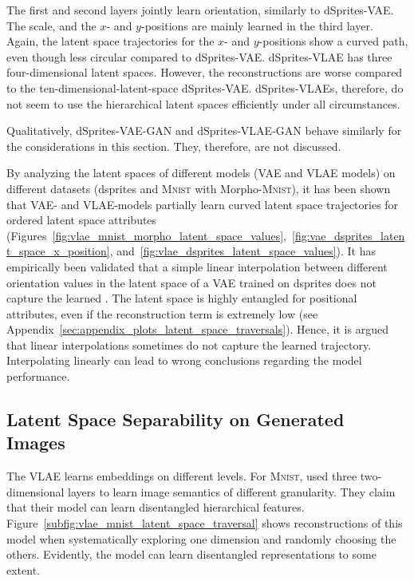 The first and second layers jointly learn orientation, similarly to dSprites-\ac{VAE}.
The scale, and the $x$- and $y$-positions are mainly learned in the third layer.
Again, the latent space trajectories for the $x$- and $y$-positions show a curved path, even though less circular compared to dSprites-\ac{VAE}.
dSprites-\ac{VLAE} has three four-dimensional latent spaces.
However, the reconstructions are worse compared to the ten-dimensional-latent-space dSprites-\ac{VAE}.
dSprites-\acp{VLAE}, therefore, do not seem to use the hierarchical latent spaces efficiently under all circumstances.

Qualitatively, dSprites-\ac{VAE}-\ac{GAN} and dSprites-\ac{VLAE}-\ac{GAN} behave similarly for the considerations in this section.
They, therefore, are not discussed.

By analyzing the latent spaces of different models (\ac{VAE} and \ac{VLAE} models) on different datasets (dsprites and \textsc{Mnist} with Morpho-\textsc{Mnist}), it has been shown that \ac{VAE}- and \ac{VLAE}-models partially learn curved latent space trajectories for ordered latent space attributes (Figures~\ref{fig:vlae_mnist_morpho_latent_space_values},~\ref{fig:vae_dsprites_latent_space_x_position}, and~\ref{fig:vlae_dsprites_latent_space_values}).
It has empirically been validated that a simple linear interpolation between different orientation values in the latent space of a \ac{VAE} trained on dsprites does not capture the learned .
The latent space is highly entangled for positional attributes, even if the reconstruction term is extremely low (see Appendix~\ref{sec:appendix_plots_latent_space_traversals}).
Hence, it is argued that linear interpolations sometimes do not capture the learned trajectory.
Interpolating linearly can lead to wrong conclusions regarding the model performance.


\subsection{Latent Space Separability on Generated Images}\label{subsec:independence-of-vlae-embeddings}

The VLAE learns embeddings on different levels.
For \textsc{Mnist}, \citet{zhao2017learning} used three two-dimensional layers to learn image semantics of different granularity.
They claim that their model can learn disentangled hierarchical features.
Figure~\ref{subfig:vlae_mnist_latent_space_traversal} shows reconstructions of this model when systematically exploring one dimension and randomly choosing the others.
Evidently, the model can learn disentangled representations to some extent.

